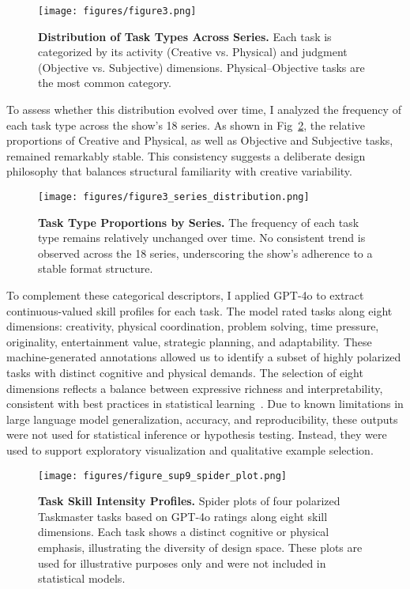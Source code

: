 \documentclass[10pt,letterpaper]{article}
\begin{document}
\begin{figure}[!h]
\centering
\texttt{[image: figures/figure3.png]}
\caption{{\bf Distribution of Task Types Across Series.}
Each task is categorized by its activity (Creative vs. Physical) and judgment (Objective vs. Subjective) dimensions. Physical–Objective tasks are the most common category.}
\label{fig:task_format}
\end{figure}
\FloatBarrier

To assess whether this distribution evolved over time, I analyzed the frequency of each task type across the show's 18 series. As shown in Fig~\ref{fig:task_type_stability}, the relative proportions of Creative and Physical, as well as Objective and Subjective tasks, remained remarkably stable. This consistency suggests a deliberate design philosophy that balances structural familiarity with creative variability.

\begin{figure}[!h]
\centering
\texttt{[image: figures/figure3\_series\_distribution.png]}
\caption{{\bf Task Type Proportions by Series.}
The frequency of each task type remains relatively unchanged over time. No consistent trend is observed across the 18 series, underscoring the show's adherence to a stable format structure.}
\label{fig:task_type_stability}
\end{figure}
\FloatBarrier



To complement these categorical descriptors, I applied GPT-4o to extract continuous-valued skill profiles for each task. The model rated tasks along eight dimensions: creativity, physical coordination, problem solving, time pressure, originality, entertainment value, strategic planning, and adaptability. These machine-generated annotations allowed us to identify a subset of highly polarized tasks with distinct cognitive and physical demands. The selection of eight dimensions reflects a balance between expressive richness and interpretability, consistent with best practices in statistical learning~\cite{Hastie2009,James2013}. Due to known limitations in large language model generalization, accuracy, and reproducibility, these outputs were not used for statistical inference or hypothesis testing. Instead, they were used to support exploratory visualization and qualitative example selection.

\begin{figure}[!h]
\centering
\texttt{[image: figures/figure\_sup9\_spider\_plot.png]}
\caption{{\bf Task Skill Intensity Profiles.}
Spider plots of four polarized Taskmaster tasks based on GPT-4o ratings along eight skill dimensions. Each task shows a distinct cognitive or physical emphasis, illustrating the diversity of design space. These plots are used for illustrative purposes only and were not included in statistical models.}
\label{fig:task_skills}
\end{figure}
\FloatBarrier
\end{document}
